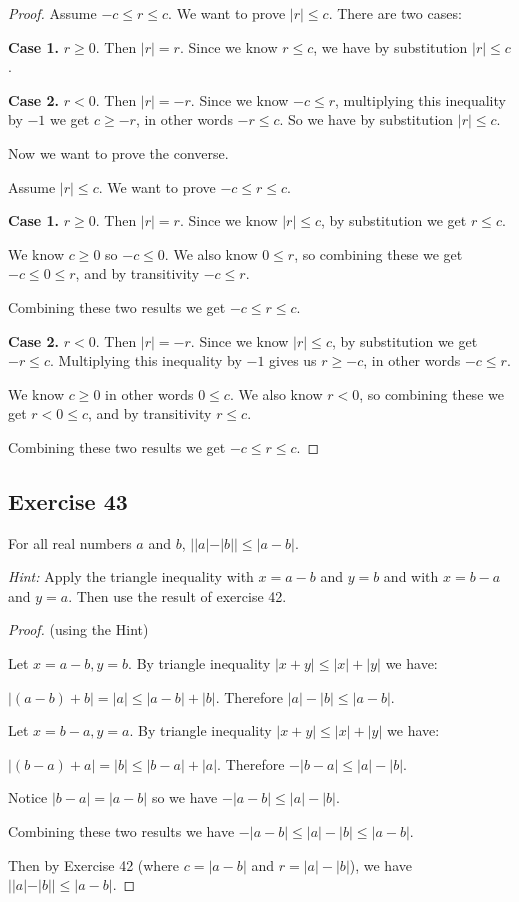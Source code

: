\documentclass[14pt]{extarticle}
\begin{document}
\begin{proof}
    Assume $-c \leq r \leq c$. We want to prove $|r| \leq c$. There are two cases:

    {\bf Case 1.} $r \geq 0$. Then $|r| = r$. Since we know $r \leq c$, we have by substitution $|r| \leq c$.

        {\bf Case 2.} $r < 0$. Then $|r| = -r$. Since we know $-c \leq r$, multiplying this inequality by $-1$ we get $c \geq -r$, in other words $-r \leq c$. So we have by substitution $|r| \leq c$.

    Now we want to prove the converse.

    Assume $|r| \leq c$. We want to prove $-c \leq r \leq c$.

        {\bf Case 1.} $r \geq 0$. Then $|r| = r$. Since we know $|r| \leq c$, by substitution we get $r \leq c$.

    We know $c \geq 0$ so $-c \leq 0$. We also know $0 \leq r$, so combining these we get $-c \leq 0 \leq r$, and by transitivity $-c \leq r$.

    Combining these two results we get $-c \leq r \leq c$.

        {\bf Case 2.} $r < 0$. Then $|r| = -r$.  Since we know $|r| \leq c$, by substitution we get $-r \leq c$. Multiplying this inequality by $-1$ gives us $r \geq -c$, in other words $-c \leq r$.

    We know $c \geq 0$ in other words $0 \leq c$. We also know $r < 0$, so combining these we get $r < 0 \leq c$, and by transitivity $r \leq c$.

    Combining these two results we get $-c \leq r \leq c$.
\end{proof}

\subsection{Exercise 43}
For all real numbers $a$ and $b$, $||a| - |b|| \leq |a - b|$.

    {\it Hint:} Apply the triangle inequality with $x = a - b$ and $y = b$ and with $x = b - a$ and $y = a$. Then use the result of exercise 42.

\begin{proof}
    (using the Hint)

    Let $x = a-b, y = b$. By triangle inequality $|x+y| \leq |x|+ |y|$ we have:

    $|(a-b)+b| = |a| \leq |a-b|+|b|$. Therefore $|a| - |b| \leq |a-b|$.

    Let $x = b-a, y = a$. By triangle inequality $|x+y| \leq |x|+ |y|$ we have:

    $|(b-a)+a| = |b| \leq |b-a|+|a|$. Therefore $-|b-a| \leq |a| - |b|$.

    Notice $|b-a| = |a-b|$ so we have $-|a-b| \leq |a| - |b|$.

    Combining these two results we have $-|a-b| \leq |a| - |b| \leq |a-b|$.

    Then by Exercise 42 (where $c = |a-b|$ and $r = |a| - |b|$), we have $||a| - |b|| \leq |a-b|$.
\end{proof}
\end{document}
